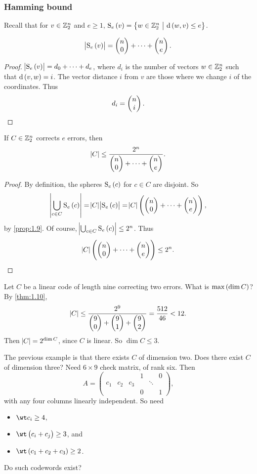\subsubsection{Hamming bound}

Recall that for $ v \in \mathbb{Z}_2^n $ and $ e \ge 1 $, $ \S_e\br{v} = \cbr{w \in \ZZ_2^n \st \d\br{w, v} \le e} $.

\begin{proposition}
\label{prop:1.9}
$$ \abs{\S_e\br{v}} = \twobyone{n}{0} + \dots + \twobyone{n}{e}. $$
\end{proposition}

\begin{proof}
$ \abs{\S_e\br{v}} = d_0 + \dots + d_e $, where $ d_i $ is the number of vectors $ w \in \mathbb{Z}_2^n $ such that $ \d\br{v, w} = i $. The vector distance $ i $ from $ v $ are those where we change $ i $ of the coordinates. Thus
$$ d_i = \begin{pmatrix} n \\ i \end{pmatrix}. $$
\end{proof}

\begin{theorem}
\label{thm:1.10}
If $ C \in \mathbb{Z}_2^n $ corrects $ e $ errors, then
$$ \abs{C} \le \dfrac{2^n}{\begin{pmatrix} n \\ 0 \end{pmatrix} + \dots + \begin{pmatrix} n \\ e \end{pmatrix}}. $$
\end{theorem}


\begin{proof}
By definition, the spheres $ \S_e\br{c} $ for $ c \in C $ are disjoint. So
$$ \abs{\bigcup_{c \in C} \S_e\br{c}} = \abs{C}\abs{\S_e\br{c}} = \abs{C}\br{\twobyone{n}{0} + \dots + \twobyone{n}{e}}, $$
by \ref{prop:1.9}. Of course, $ \abs{\bigcup_{c \in C} \S_e\br{c}} \le 2^n $. Thus
$$ \abs{C}\br{\twobyone{n}{0} + \dots + \twobyone{n}{e}} \le 2^n. $$
\end{proof}

\begin{example*}
Let $ C $ be a linear code of length nine correcting two errors. What is $ \max\br{\dim C} $? By \ref{thm:1.10},
$$ \abs{C} \le \dfrac{2^9}{\begin{pmatrix} 9 \\ 0 \end{pmatrix} + \begin{pmatrix} 9 \\ 1 \end{pmatrix} + \begin{pmatrix} 9 \\ 2 \end{pmatrix}} = \dfrac{512}{46} < 12. $$
Then $ \abs{C} = 2^{\dim C} $, since $ C $ is linear. So $ \dim C \le 3 $.
\end{example*}

\pagebreak

The previous example is that there exists $ C $ of dimension two. Does there exist $ C $ of dimension three? Need $ 6 \times 9 $ check matrix, of rank six. Then
$$ A =
\begin{pmatrix}
& & & 1 & & 0 \\
c_1 & c_2 & c_3 & & \ddots & \\
& & & 0 & & 1
\end{pmatrix},
$$
with any four columns linearly independent. So need
\begin{itemize}
\item $ \wt c_i \ge 4 $,
\item $ \wt \br{c_i + c_j} \ge 3 $, and
\item $ \wt \br{c_1 + c_2 + c_3} \ge 2 $.
\end{itemize}
Do such codewords exist?

